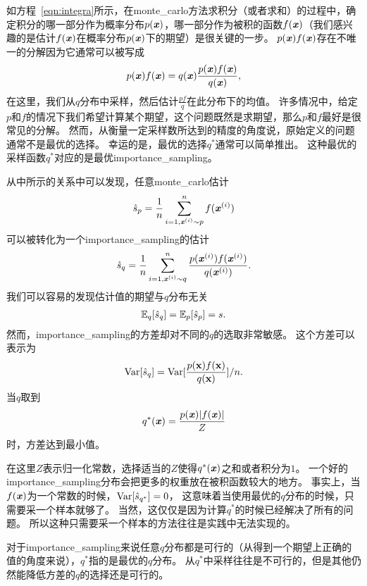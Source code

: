 如方程~\eqref{eqn:integra}所示，在\gls{monte_carlo}方法求积分（或者求和）的过程中，确定积分的哪一部分作为概率分布$p(\boldsymbol{\mathit{x}})$，哪一部分作为被积的函数$f(\boldsymbol{\mathit{x}})$（我们感兴趣的是估计$f(\boldsymbol{\mathit{x}})$在概率分布$p(\boldsymbol{\mathit{x}})$下的期望）是很关键的一步。
$p(\boldsymbol{\mathit{x}})f(\boldsymbol{\mathit{x}})$存在不唯一的分解因为它通常可以被写成
\begin{align}
\label{eqn:decomposition}
p(\boldsymbol{\mathit{x}})f(\boldsymbol{\mathit{x}}) = q(\boldsymbol{\mathit{x}}) \frac{p(\boldsymbol{\mathit{x}})f(\boldsymbol{\mathit{x}})}{q(\boldsymbol{\mathit{x}})},
\end{align}
在这里，我们从$q$分布中采样，然后估计$\frac{pf}{q}$在此分布下的均值。
许多情况中，给定$p$和$f$的情况下我们希望计算某个期望，这个问题既然是求期望，那么$p$和$f$最好是很常见的分解。
然而，从衡量一定采样数所达到的精度的角度说，原始定义的问题通常不是最优的选择。
幸运的是，最优的选择$q^*$通常可以简单推出。
这种最优的采样函数$q^*$对应的是最优\gls{importance_sampling}。


从中所示的关系中可以发现，任意\gls{monte_carlo}估计
\begin{align}
\hat{s}_p = \frac{1}{n}\sum_{i=1,\boldsymbol{\mathit{x}}^{(i)}\sim p}^{n}f(\boldsymbol{\mathit{x}}^{(i)})
\end{align}
可以被转化为一个\gls{importance_sampling}的估计
\begin{align}
\hat{s}_q = \frac{1}{n}\sum_{i=1,\boldsymbol{\mathit{x}}^{(i)}\sim q}^{n}\frac{p(\boldsymbol{\mathit{x}}^{(i)})f(\boldsymbol{\mathit{x}}^{(i)})}{q(\boldsymbol{\mathit{x}}^{(i)})}.
\end{align}
我们可以容易的发现估计值的期望与$q$分布无关
\begin{align}
\mathbb{E}_q [\hat{s}_q] = \mathbb{E}_p [\hat{s}_p] = s.
\end{align}
然而，\gls{importance_sampling}的方差却对不同的$q$的选取非常敏感。
这个方差可以表示为
\begin{align}
\label{eqn:variance_of_is}
\text{Var} [\hat{s}_q] = \text{Var} [\frac{p(\mathbf{x})f(\mathbf{x})}{q(\mathbf{x})}]/n.
\end{align}
当$q$取到
\begin{align}
q^*(\boldsymbol{\mathit{x}}) = \frac{p(\boldsymbol{\mathit{x}})\vert f(\boldsymbol{\mathit{x}})\vert}{Z}
\end{align}
时，方差达到最小值。


在这里$Z$表示归一化常数，选择适当的$Z$使得$q^*(\boldsymbol{\mathit{x}})$之和或者积分为$1$。
一个好的\gls{importance_sampling}分布会把更多的权重放在被积函数较大的地方。
事实上，当$f(\boldsymbol{\mathit{x}})$为一个常数的时候，$\text{Var}[\hat{s}_{q^*}]=0$， 这意味着当使用最优的$q$分布的时候，只需要采一个样本就够了。
当然，这仅仅是因为计算$q^*$的时候已经解决了所有的问题。
所以这种只需要采一个样本的方法往往是实践中无法实现的。

对于\gls{importance_sampling}来说任意$q$分布都是可行的（从得到一个期望上正确的值的角度来说），$q^*$指的是最优的$q$分布。
从$q^*$中采样往往是不可行的，但是其他仍然能降低方差的$q$的选择还是可行的。



